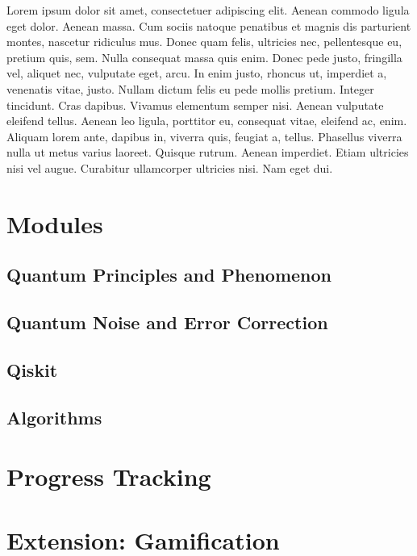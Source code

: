 Lorem ipsum dolor sit amet, consectetuer adipiscing elit. Aenean commodo ligula eget dolor. Aenean massa. Cum sociis natoque penatibus et magnis dis parturient montes, nascetur ridiculus mus. Donec quam felis, ultricies nec, pellentesque eu, pretium quis, sem. Nulla consequat massa quis enim. Donec pede justo, fringilla vel, aliquet nec, vulputate eget, arcu. In enim justo, rhoncus ut, imperdiet a, venenatis vitae, justo. Nullam dictum felis eu pede mollis pretium. Integer tincidunt. Cras dapibus. Vivamus elementum semper nisi. Aenean vulputate eleifend tellus. Aenean leo ligula, porttitor eu, consequat vitae, eleifend ac, enim. Aliquam lorem ante, dapibus in, viverra quis, feugiat a, tellus. Phasellus viverra nulla ut metus varius laoreet. Quisque rutrum. Aenean imperdiet. Etiam ultricies nisi vel augue. Curabitur ullamcorper ultricies nisi. Nam eget dui. 

\section{Modules}
\subsection{Quantum Principles and Phenomenon}
\subsection{Quantum Noise and Error Correction}
\subsection{Qiskit}
\subsection{Algorithms}

\section{Progress Tracking}

\section{Extension: Gamification}